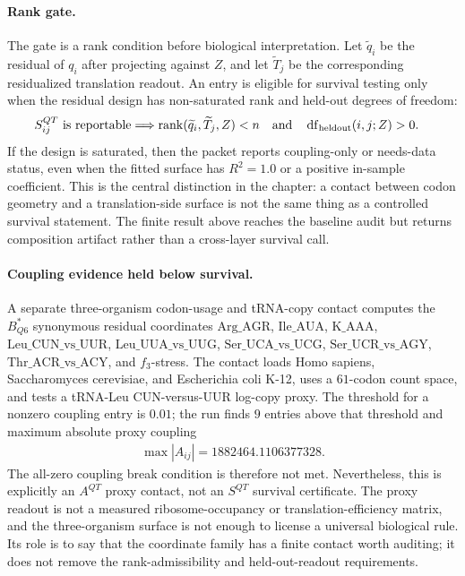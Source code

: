\paragraph{Rank gate.}
The gate is a rank condition before biological interpretation.  Let $\widetilde q_i$ be the residual of $q_i$ after projecting against $Z$, and let $\widetilde T_j$ be the corresponding residualized translation readout.  An entry is eligible for survival testing only when the residual design has non-saturated rank and held-out degrees of freedom:
$$
\begin{aligned}
S^{QT}_{ij}\ \hbox{is reportable}
&\Longrightarrow
\operatorname{rank}(\widetilde q_i,\widetilde T_j,Z) < n
\quad\hbox{and}\quad
\operatorname{df}_{\mathrm{heldout}}(i,j;Z)>0.
\end{aligned}
$$
If the design is saturated, then the packet reports coupling-only or needs-data status, even when the fitted surface has $R^2=1.0$ or a positive in-sample coefficient.  This is the central distinction in the chapter: a contact between codon geometry and a translation-side surface is not the same thing as a controlled survival statement.  The finite result above reaches the baseline audit but returns composition artifact rather than a cross-layer survival call.

\paragraph{Coupling evidence held below survival.}
A separate three-organism codon-usage and tRNA-copy contact computes the $B^*_{Q6}$ synonymous residual coordinates
$\mathrm{Arg\_AGR}$, $\mathrm{Ile\_AUA}$, $\mathrm{K\_AAA}$, $\mathrm{Leu\_CUN\_vs\_UUR}$, $\mathrm{Leu\_UUA\_vs\_UUG}$, $\mathrm{Ser\_UCA\_vs\_UCG}$, $\mathrm{Ser\_UCR\_vs\_AGY}$, $\mathrm{Thr\_ACR\_vs\_ACY}$, and $f_3$-stress.  The contact loads Homo sapiens, Saccharomyces cerevisiae, and Escherichia coli K-12, uses a $61$-codon count space, and tests a tRNA-Leu CUN-versus-UUR log-copy proxy.  The threshold for a nonzero coupling entry is $0.01$; the run finds $9$ entries above that threshold and maximum absolute proxy coupling
$$
\begin{aligned}
\max |A_{ij}| = 1882464.1106377328.
\end{aligned}
$$
The all-zero coupling break condition is therefore not met.  Nevertheless, this is explicitly an $A^{QT}$ proxy contact, not an $S^{QT}$ survival certificate.  The proxy readout is not a measured ribosome-occupancy or translation-efficiency matrix, and the three-organism surface is not enough to license a universal biological rule.  Its role is to say that the coordinate family has a finite contact worth auditing; it does not remove the rank-admissibility and held-out-readout requirements.


